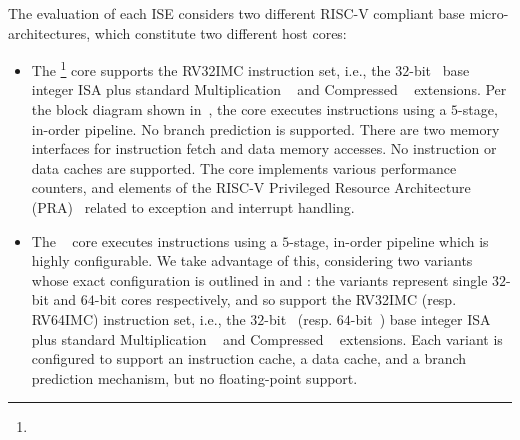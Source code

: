 
The evaluation of each ISE considers two different RISC-V compliant base
micro-architectures, which constitute two different host cores:

\begin{itemize}
\item The \footnote{%
      } core 
      supports the 
      RV32IMC 
      instruction set, i.e.,
      the 
             $32$-bit~\cite[Section 2]{RV:ISA:I:19} 
      base integer ISA plus 
      standard 
      Multiplication ~\cite[Section  7]{RV:ISA:I:19}
      and
      Compressed ~\cite[Section 16]{RV:ISA:I:19}
      extensions.
      Per the block diagram shown in~,
      the core 
      executes instructions using a $5$-stage, in-order pipeline.
      No branch prediction is supported.
      There are two memory interfaces for instruction fetch and data memory
      accesses.
      No instruction or data caches are supported.
      The core implements various performance counters,
      and
      elements of the
      RISC-V Privileged Resource Architecture (PRA)~\cite[Chapter 3]{RV:ISA:II:17}
      related to exception and interrupt handling.

\item The ~\cite{rocket:16} 
        core
      executes instructions using a $5$-stage, in-order pipeline
      which is highly configurable.
      We take advantage of this, considering two variants whose
      exact configuration is outlined in
      and 
      :
      the variants represent single $32$-bit and $64$-bit cores respectively,
      and so
      support  the 
      RV32IMC 
      (resp. RV64IMC)
      instruction set, i.e.,
      the 
             $32$-bit~\cite[Section 2]{RV:ISA:I:19} 
      (resp. $64$-bit~\cite[Section 5]{RV:ISA:I:19})
      base integer ISA plus 
      standard 
      Multiplication ~\cite[Section  7]{RV:ISA:I:19}
      and
      Compressed ~\cite[Section 16]{RV:ISA:I:19}
      extensions.
      Each variant is configured to support
      an instruction cache, 
      a  data        cache,
      and
      a  branch prediction mechanism,
      but 
      no floating-point support.

\end{itemize}

